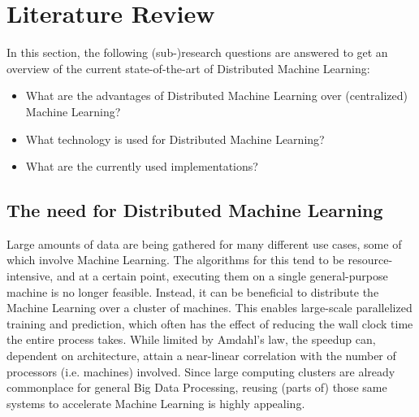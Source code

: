 \section{Literature Review}
In this section, the following (sub-)research questions are answered to get an overview of the current state-of-the-art of Distributed Machine Learning:
\begin{itemize}
	\item What are the advantages of Distributed Machine Learning over (centralized) Machine Learning?
	\item What technology is used for Distributed Machine Learning?
	\item What are the currently used implementations?
\end{itemize}

\subsection{The need for Distributed Machine Learning}
Large amounts of data are being gathered for many different use cases, some of which involve Machine Learning. The algorithms for this tend to be resource-intensive, and at a certain point, executing them on a single general-purpose machine is no longer feasible.
Instead, it can be beneficial to distribute the Machine Learning over a cluster of machines. This enables large-scale parallelized training and prediction, which often has the effect of reducing the wall clock time the entire process takes. While limited by Amdahl's law\cite{hill2008amdahl}, the speedup can, dependent on architecture, attain a near-linear correlation with the number of processors (i.e. machines) involved. Since large computing clusters are already commonplace for general Big Data Processing, reusing (parts of) those same systems to accelerate Machine Learning is highly appealing.



